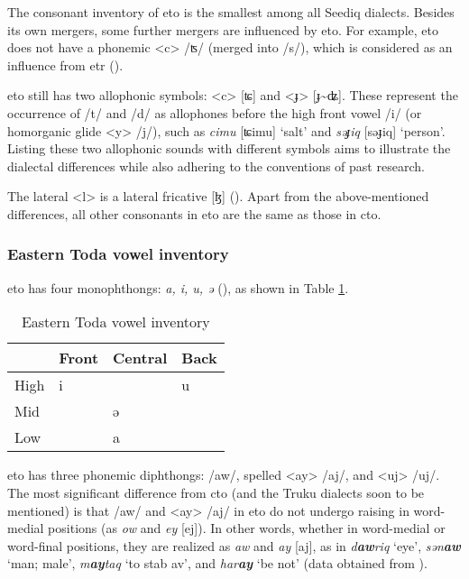 The consonant inventory of \acl{eto} is the smallest among all Seediq dialects. Besides its own mergers, some further mergers are influenced by \acl{eto}. For example, \acl{eto} does not have a phonemic <c> /ʦ/ (merged into /s/), which is considered as an influence from \acl{etr} (\cite{lee2015tawsa}). 

\acl{eto} still has two allophonic symbols: <c> [ʨ] and <ɟ> [ɟ\~{ }ʥ]. These represent the occurrence of /t/ and /d/ as allophones before the high front vowel /i/ (or homorganic glide <y> /j/), such as \textit{cimu} [ʨimu] `salt' and \textit{səɟiq} [səɟiq] `person'. Listing these two allophonic sounds with different symbols aims to illustrate the dialectal differences while also adhering to the conventions of past research.

The lateral <l> is a lateral fricative [ɮ] (\cite{lee2012segment,lee2015tawsa}). Apart from the above-mentioned differences, all other consonants in \acl{eto} are the same as those in \acl{cto}.

\subsubsection{Eastern Toda vowel inventory}

\acl{eto} has four monophthongs: \textit{a, i, u, ə} (\cite{lee2012segment,lee2015tawsa}), as shown in Table \ref{tab:etoV}.

\begin{table}[!htbp]
\centering
\caption{Eastern Toda vowel inventory}
\label{tab:etoV}
\begin{tabular}{llll}
\hline
     & Front & Central & Back \\ \hline
High &  i    &         &  u   \\
Mid  &       &  ə      &      \\
Low  &       &  a      &      \\ \hline
\end{tabular}
\end{table}

\acl{eto} has three phonemic diphthongs: /aw/, spelled <ay> /aj/, and <uj> /uj/. The most significant difference from \acl{cto} (and the Truku dialects soon to be mentioned) is that /aw/ and <ay> /aj/ in \acl{eto} do not undergo raising in word-medial positions (as \textit{ow} and \textit{ey} [ej]). In other words, whether in word-medial or word-final positions, they are realized as \textit{aw} and \textit{ay} [aj], as in \textit{d\textbf{aw}riq} `eye', \textit{sən\textbf{aw}} `man; male', \textit{m\textbf{ay}taq} `to stab \acs{av}', and \textit{har\textbf{ay}} `be not' (data obtained from \cite{lee2015tawsa}).

